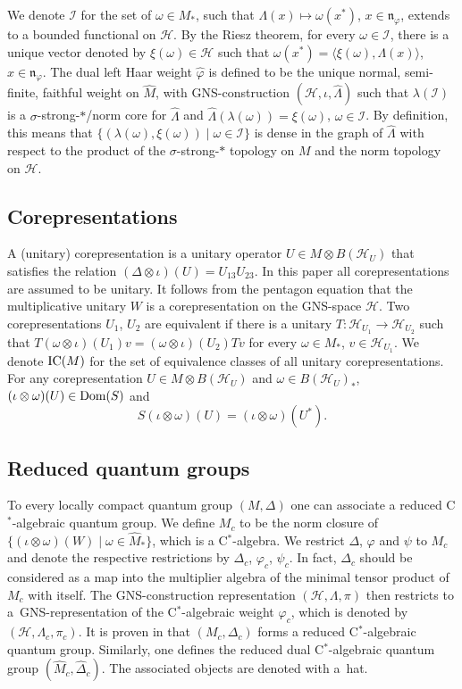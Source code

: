 \documentclass[11pt]{article}
\numberwithin{equation}{section}
\theoremstyle{definition}
\newcommand{\cHil}{\mathcal{H}}
\newcommand{\nphi}{\mathfrak{n}_\varphi}
\newcommand{\ICM}{\text{\rm IC}(M)}
\newcommand{\Dom}{\text{\rm Dom}}
\begin{document}
 We denote $\mathcal{I}$ for the set of
$\omega \in M_\ast$, such that $\Lambda(x) \mapsto \omega(x^\ast)$,
$x \in \nphi$, extends to a bounded functional on $\cHil$. By the
Riesz theorem, for every $\omega \in \mathcal{I}$, there is a
unique vector denoted by $\xi(\omega) \in \cHil$ such that
$\omega(x^\ast) = \langle \xi(\omega)  , \Lambda(x) \rangle$, $x \in
\nphi$. The dual left Haar weight $\hat{\varphi}$ is def\/ined to be
the unique normal, semi-f\/inite, faithful weight on $\hat{M}$, with
GNS-construction $(\cHil, \iota, \hat{\Lambda})$ such that
$\lambda(\mathcal{I})$ is a $\sigma$-strong-$\ast$/norm core for
$\hat{\Lambda}$ and $\hat{\Lambda}(\lambda(\omega)) = \xi(\omega)$,
$\omega \in \mathcal{I}$. By def\/inition, this means that $\{ (\lambda(\omega), \xi(\omega)) \mid \omega \in \mathcal{I} \}$ is dense in the graph of $\hat{\Lambda}$ with respect to the product of the $\sigma$-strong-$\ast$ topology on $M$ and the norm topology on $\cHil$.

\subsection*{Corepresentations}

A (unitary) corepresentation is a unitary operator $U \in M \otimes B(\cHil_U)$ that satisf\/ies the relation $(\Delta \otimes \iota) (U) = U_{13}U_{23}$. In this paper all corepresentations are assumed to be unitary. It follows from the pentagon equation that the multiplicative unitary $W$ is a corepresentation on the GNS-space $\cHil$. Two corepresentations $U_1$, $U_2$ are equivalent if there is a unitary $T: \cHil_{U_1} \rightarrow \cHil_{U_2}$ such that $T (\omega \otimes \iota)(U_1) v = (\omega \otimes \iota)(U_2) T v$ for every $\omega \in M_\ast$, $v \in \cHil_{U_1}$. We denote $\ICM$ for the set of equivalence classes of all unitary corepresentations. For any corepresentation $U \in M \otimes B(\cHil_U)$ and $\omega \in B(\cHil_U)_\ast$, $(\iota \otimes \omega)(U) \in \Dom(S)$ and
\[
S (\iota \otimes \omega)(U) = (\iota \otimes \omega)(U^\ast) .
\]

\subsection*{Reduced quantum groups}
To every locally compact quantum group $(M, \Delta)$ one can associate a reduced C$^\ast$-algebraic quantum group. We def\/ine $M_c$ to be the norm closure of $\{ (\iota \otimes \omega)(W) \mid \omega \in \hat{M}_\ast \}$, which is a C$^\ast$-algebra. We restrict $\Delta$, $\varphi$ and $\psi$ to $M_c$ and denote the respective restrictions by $\Delta_c$, $\varphi_c$, $\psi_c$. In fact, $\Delta_c$ should be considered as a map into the multiplier algebra of the minimal tensor product of $M_c$ with itself. The GNS-construction representation $(\cHil, \Lambda, \pi)$ then restricts to a~GNS-representation of the C$^\ast$-algebraic weight $\varphi_c$, which is denoted by $(\cHil, \Lambda_c, \pi_c)$.
It is proven in \cite{KusVae} that $(M_c, \Delta_c)$ forms a reduced C$^\ast$-algebraic quantum group.
Similarly, one def\/ines the reduced dual  C$^\ast$-algebraic quantum group $(\hat{M}_c, \hat{\Delta}_c)$. The associated objects are denoted with a~hat.
\end{document}
